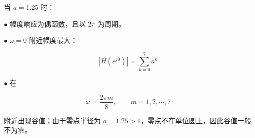 \documentclass[11pt]{ctexart}
\begin{document}
当 \(a=1.25\) 时：\par



\noindent\(\bullet\) 幅度响应为偶函数，且以 \(2\pi\) 为周期。\par

\noindent\(\bullet\) \(\omega=0\) 附近幅度最大：\par



\[

  |H(e^{j0})|=\sum_{k=0}^{7}a^k

  \]



\noindent\(\bullet\) 在\par



\[

  \omega=\frac{2\pi m}{8},\qquad m=1,2,\cdots,7

  \]



附近出现谷值；由于零点半径为 \(a=1.25>1\)，零点不在单位圆上，因此谷值一般不为零。\par
\end{document}
